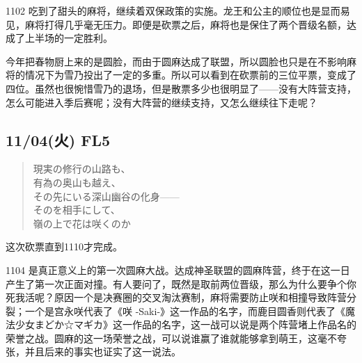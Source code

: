 1102 吃到了甜头的麻将，继续着双保政策的实施。龙王和公主的顺位也是显而易见，麻将打得几乎毫无压力。即便是砍票之后，麻将也是保住了两个晋级名额，达成了上半场的一定胜利。

今年把春物厨上来的是圆脸，而由于圆麻达成了联盟，所以圆脸也只是在不影响麻将的情况下为雪乃投出了一定的多重。所以可以看到在砍票前的三位平票，变成了四位。虽然也很惋惜雪乃的退场，但是散票多少也很明显了——没有大阵营支持，怎么可能进入季后赛呢；没有大阵营的继续支持，又怎么继续往下走呢？

\subsection{11/04(火) FL5}

\begin{quote}\ttfamily
現実の修行の山路も、                                      \\
有為の奥山も越え、                                        \\
その先にいる深山幽谷の化身——                            \\
そのを相手にして、 \\
嶺の上で花は咲くのか
\end{quote}


这次砍票直到1110才完成。

1104 是真正意义上的第一次圆麻大战。达成神圣联盟的圆麻阵营，终于在这一日产生了第一次正面对撞。有人要问了，既然是取前两位晋级，那么为什么要争个你死我活呢？原因一个是决赛圈的交叉淘汰赛制，麻将需要防止咲和相撞导致阵营分裂；一个是宫永咲代表了《咲 -Saki-》这一作品的名字，而鹿目圆香则代表了《魔法少女まどか☆マギカ》这一作品的名字，这一战可以说是两个阵营堵上作品名的荣誉之战。圆麻的这一场荣誉之战，可以说谁赢了谁就能够拿到萌王，这毫不夸张，并且后来的事实也证实了这一说法。

